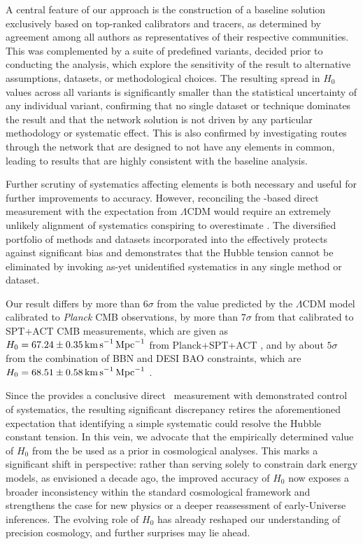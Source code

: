 A central feature of our approach is the construction of a baseline solution exclusively based on top-ranked calibrators and tracers, as determined by agreement among all authors as representatives of their respective communities. This was complemented by a suite of predefined variants, decided prior to conducting the analysis, which explore the sensitivity of the result to alternative assumptions, datasets, or methodological choices. The resulting spread in $H_0$ values across all variants is significantly smaller than the statistical uncertainty of any individual variant, confirming that no single dataset or technique dominates the result and that the network solution is not driven by any particular methodology or systematic effect. This is also confirmed by investigating routes through the network that are designed to not have any elements in common, leading to results that are highly consistent with the baseline analysis.

Further scrutiny of systematics affecting {\DN} elements is both necessary and useful for further improvements to {\Hcst} accuracy. However, reconciling the {\DN}-based direct {\Hcst} measurement with the expectation from $\Lambda$CDM would require an extremely unlikely alignment of systematics conspiring to overestimate {\Hcst}. The diversified portfolio of methods and datasets incorporated into the {\DN} effectively protects against significant bias and demonstrates that the Hubble tension cannot be eliminated by invoking as-yet unidentified systematics in any single method or dataset.

Our result differs by more than $6\sigma$ from the value predicted by the $\Lambda$CDM model calibrated to \textit{Planck} CMB observations, by more than $7\sigma$ from that calibrated to SPT+ACT CMB measurements, which are given as  $H_0 = 67.24 \pm 0.35 \,{\rm km\,s}^{-1}{\rm\,Mpc}^{-1} $ from Planck+SPT+ACT \citep[Eq.~(54)~of][]{2025arXiv250620707C}, and by about $5\sigma$ from the combination of BBN and DESI BAO constraints, which are $H_0 = 68.51 \pm 0.58 \,{\rm km\,s}^{-1}{\rm\,Mpc}^{-1}$   \citep[Tab.~V~of][]{DESI:2025zgx}.

Since the {\DN} provides a conclusive direct \Hcst\ measurement with demonstrated control of systematics, the resulting significant discrepancy retires the aforementioned expectation that identifying a simple systematic could resolve the Hubble constant tension. 
In this vein, we advocate that the empirically determined value of $H_0$ from the {\DN} be used as a prior in cosmological analyses. 
This marks a significant shift in perspective: rather than serving solely to constrain dark energy models, as envisioned a decade ago, the improved accuracy of $H_0$ now exposes a broader inconsistency within the standard cosmological framework and strengthens the case for new physics or a deeper reassessment of early-Universe inferences. The evolving role of $H_0$ has already reshaped our understanding of precision cosmology, and further surprises may lie ahead.
